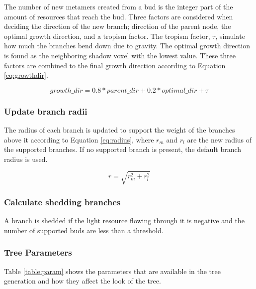 \documentclass{article}
\begin{document}
	  			The number of new metamers created from a bud is the integer part of the amount of resources that reach the bud. Three factors are considered when deciding the direction of the new branch; direction of the parent node, the optimal growth direction, and a tropism factor. The tropism factor, $\tau$, simulate how much the branches bend down due to gravity. The optimal growth direction  is found as the neighboring shadow voxel with the lowest value. These three factors are combined to the final growth direction according to Equation \ref{eq:growthdir}. \citep{palubicki2009self}
	  			
	  			\begin{equation}
	  				\label{eq:growthdir}
	  				growth\_dir = 0.8 * parent\_dir + 0.2 * optimal\_dir + \tau
	  			\end{equation}
	  			
	  		\subsubsection*{Update branch radii}
	  			
	  			The radius of each branch is updated to support the weight of the branches above it according to Equation \ref{eq:radius}, where $r_m$ and $r_l$ are the new radius of the supported branches. If no supported branch is present, the default branch radius is used. \citep{mvech1996visual}
	  			
	  			\begin{equation}
	  				\label{eq:radius}
	  				r = \sqrt{r_m^2 + r_l^2}
	  			\end{equation}
	  			
	  		\subsubsection*{Calculate shedding branches}
	  			
	  			A branch is shedded if the light resource flowing through it is negative and the number of supported buds are less than a threshold.
	  			\citep{mvech1996visual}
	  		
	  		
	  		\subsubsection*{Tree Parameters}
	  		
	  		Table \ref{table:param} shows the parameters that are available in the tree generation and how they affect the look of the tree. 
	  		
\end{document}
